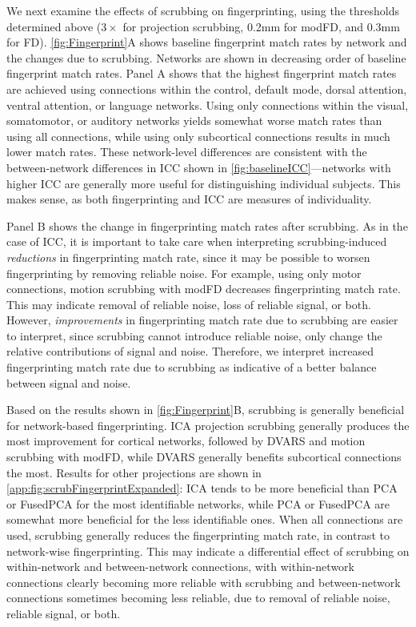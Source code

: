 \documentclass{article}
\begin{document}
We next examine the effects of scrubbing on fingerprinting, using the thresholds determined above ($3\times$ for projection scrubbing, 0.2mm for modFD, and 0.3mm for FD). \autoref{fig:Fingerprint}A shows baseline fingerprint match rates by network and the changes due to scrubbing. Networks are shown in decreasing order of baseline fingerprint match rates. Panel A shows that the highest fingerprint match rates are achieved using connections within the control, default mode, dorsal attention, ventral attention, or language networks. Using only connections within the visual, somatomotor, or auditory networks yields somewhat worse match rates than using all connections, while using only subcortical connections results in much lower match rates. These network-level differences are consistent with the between-network differences in ICC shown in
\autoref{fig:baselineICC}---networks with higher ICC are generally more
useful for distinguishing individual subjects. This makes sense, as both
fingerprinting and ICC are measures of individuality. 

Panel B shows the change in fingerprinting match rates after scrubbing. As in the case of ICC, it is important to take care when interpreting scrubbing-induced \textit{reductions} in fingerprinting match rate, since it may be possible to worsen fingerprinting by removing reliable noise. For example, using only motor connections, motion scrubbing with modFD decreases fingerprinting match rate. This may indicate removal of reliable noise, loss of reliable signal, or both. However, \textit{improvements} in fingerprinting match rate due to scrubbing are easier to interpret, since scrubbing cannot introduce reliable noise, only change the relative contributions of signal and noise. Therefore, we interpret increased fingerprinting match rate due to scrubbing as indicative of a better balance between signal and noise. 

Based on the results shown in \autoref{fig:Fingerprint}B, scrubbing is generally beneficial for network-based fingerprinting. ICA projection scrubbing generally produces the most improvement for cortical networks, followed by DVARS and motion scrubbing with modFD, while DVARS generally benefits subcortical connections the most. Results for other projections are shown in \autoref{app:fig:scrubFingerprintExpanded}: ICA tends to be more beneficial than PCA or FusedPCA for the most identifiable networks, while PCA or FusedPCA are somewhat more beneficial for the less identifiable ones.  When all connections are used, scrubbing generally reduces the fingerprinting match rate, in contrast to network-wise fingerprinting. This may indicate a differential effect of scrubbing on within-network and between-network connections, with within-network connections clearly becoming more reliable with scrubbing and between-network connections sometimes becoming less reliable, due to removal of reliable noise, reliable signal, or both.
\end{document}
